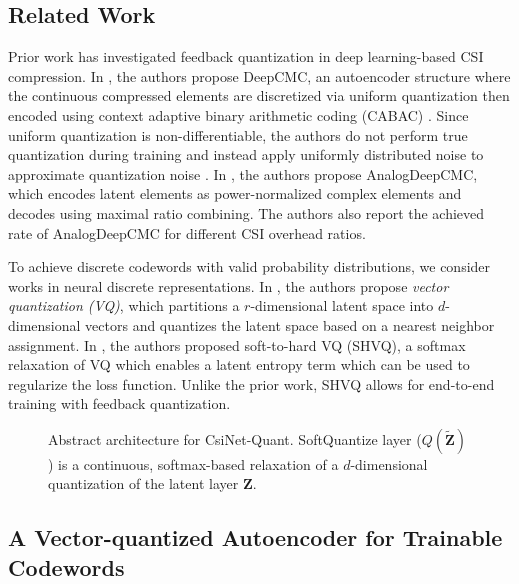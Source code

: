 \subsection{Related Work}

Prior work has investigated feedback quantization in deep learning-based CSI compression. In \cite{ref:Yang2019DeepCMC}, the authors propose DeepCMC, an autoencoder structure where the continuous compressed elements are discretized via uniform quantization then encoded using context adaptive binary arithmetic coding (CABAC) \cite{ref:Marpe2003CABAC}. Since uniform quantization is non-differentiable, the authors do not perform true quantization during training and instead apply uniformly distributed noise to approximate quantization noise \cite{ref:Yang2019DeepCMC}. In \cite{ref:Mashhadi2020AnalogDeepCMC}, the authors propose AnalogDeepCMC, which encodes latent elements as power-normalized complex elements and decodes using maximal ratio combining. The authors also report the achieved rate of AnalogDeepCMC for different CSI overhead ratios.

To achieve discrete codewords with valid probability distributions, we consider works in neural discrete representations. In \cite{ref:Oord2017Neural}, the authors propose \emph{vector quantization (VQ)}, which partitions a $r$-dimensional latent space into $d$-dimensional vectors and quantizes the latent space based on a nearest neighbor assignment. In \cite{ref:Agustsson2017SoftToHard}, the authors proposed soft-to-hard VQ (SHVQ), a softmax relaxation of VQ which enables a latent entropy term which can be used to regularize the loss function.  Unlike the prior work, SHVQ allows for end-to-end training with feedback quantization.

\begin{figure}[!hbtp]
\centering
\def\svgwidth{0.8\columnwidth}

\caption{Abstract architecture for CsiNet-Quant. SoftQuantize layer ($Q(\tilde{\mathbf Z})$) is a continuous, softmax-based relaxation of a $d$-dimensional quantization of the latent layer $\mathbf Z$.}
\label{fig:csinet_quant}
\end{figure}

\subsection{A Vector-quantized Autoencoder for Trainable Codewords}

